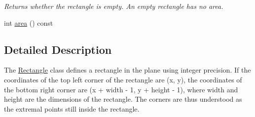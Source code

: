 \begin{DoxyCompactItemize}
\begin{DoxyCompactList}\small\item\em Returns whether the rectangle is empty. An empty rectangle has no area. \end{DoxyCompactList}\item 
int \hyperlink{class_f_f_l_d_1_1_rectangle_a68cbcd58fbc7b8aa235917abf4580da7}{area} () const 
\end{DoxyCompactItemize}


\subsection{Detailed Description}
The \hyperlink{class_f_f_l_d_1_1_rectangle}{Rectangle} class defines a rectangle in the plane using integer precision. If the coordinates of the top left corner of the rectangle are (x, y), the coordinates of the bottom right corner are (x + width -\/ 1, y + height -\/ 1), where width and height are the dimensions of the rectangle. The corners are thus understood as the extremal points still inside the rectangle. 

